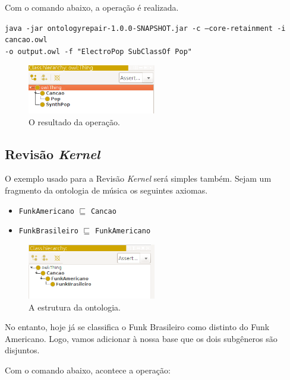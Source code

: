 Com o comando abaixo, a operação é realizada.

\begin{small}
	\texttt{java -jar ontologyrepair-1.0.0-SNAPSHOT.jar -c --core-retainment -i cancao.owl \\ -o output.owl -f "ElectroPop SubClassOf Pop"}
\end{small}

\begin{figure}[H]
	\centering
	\includegraphics[width=0.5\textwidth]{Capitulos/Implementacao/ck2.png}
	\caption{O resultado da operação.}
\end{figure}

\subsection{Revisão \textit{Kernel}}

O exemplo usado para a Revisão \textit{Kernel} será simples também. Sejam um fragmento da ontologia de música os seguintes axiomas.

\begin{itemize}
	\item \texttt{FunkAmericano} $ \sqsubseteq $ \texttt{Cancao}
	\item \texttt{FunkBrasileiro} $ \sqsubseteq $ \texttt{FunkAmericano}
\end{itemize}

\begin{figure}[H]
	\centering
	\includegraphics[width=0.5\textwidth]{Capitulos/Implementacao/r1.png}
	\caption{A estrutura da ontologia.}
\end{figure}

No entanto, hoje já se classifica o Funk Brasileiro como distinto do Funk Americano. Logo, vamos adicionar à nossa base que os dois subgêneros são disjuntos.

Com o comando abaixo, acontece a operação:

